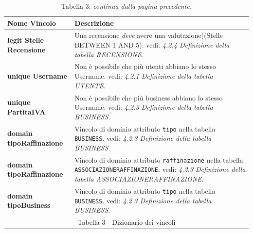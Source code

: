 \documentclass[a4paper,12pt]{article}
\begin{document}
\newpage\null{}\setcounter{page}{11}
\vspace{-2cm}
\begin{flushleft}
\begin{table}[htbp]
\caption*{Tabella 3: {\it continua dalla pagina precedente.}}
\begin{tabular}[c]{| m{6cm} | m{10cm} |}
\hline
\bf Nome Vincolo&\bf Descrizione\\
\hline
{\bf legit Stelle Recensione}
&\small Una recensione {\it deve} avere una valutazione((Stelle BETWEEN 1 AND 5).
vedi: {\it 4.2.4 Definizione della tabella RECENSIONE}.
\\
\hline

{\bf unique Username}
&\small Non è possibile che più utenti abbiano lo stesso Username.
vedi: {\it 4.2.1 Definizione della tabella UTENTE}.
\\
\hline

{\bf unique PartitaIVA}
&\small Non è possibile che più business abbiano lo stesso Username.
vedi: {\it 4.2.3 Definizione della tabella BUSINESS}.
\\
\hline

{\bf domain tipoRaffinazione}
&\small Vincolo di dominio attributo \verb|tipo| nella tabella \verb|BUSINESS|.
vedi: {\it 4.2.3 Definizione della tabella BUSINESS}.
\\
\hline

{\bf domain tipoRaffinazione}
&\small Vincolo di dominio attributo \verb|raffinazione| nella tabella \verb|ASSOCIAZIONERAFFINAZIONE|.
vedi: {\it 4.2.3 Definizione della tabella ASSOCIAZIONERAFFINAZIONE}.
\\
\hline

{\bf domain tipoBusiness}
&\small Vincolo di dominio attributo \verb|tipo| nella tabella \verb|BUSINESS|.
vedi: {\it 4.2.3 Definizione della tabella BUSINESS}.
\\
\hline
\multicolumn{2}{c}{\footnotesize{\normalsize Tabella 3 - Dizionario dei vincoli}}
\end{tabular}
\end{table}
\end{flushleft}
\newpage
\end{document}
